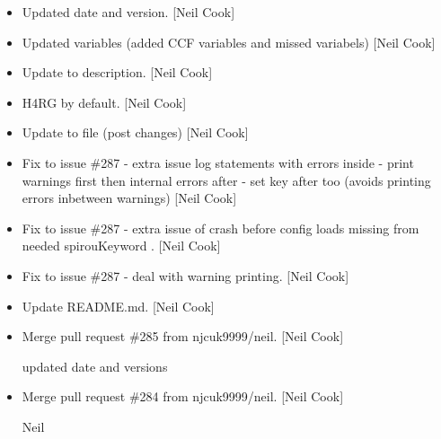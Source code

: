 \documentclass[a4paper,10pt,english]{report}
\begin{document}
\begin{itemize}
\item {} 
Updated date and version. {[}Neil Cook{]}

\item {} 
Updated variables (added CCF variables and missed 
variabels) {[}Neil Cook{]}

\item {} 
Update to  description. {[}Neil Cook{]}

\item {} 
H4RG by default. {[}Neil Cook{]}

\item {} 
Update to  file (post  changes) {[}Neil Cook{]}

\item {} 
Fix to issue \#287 - extra issue log statements with errors inside -
print warnings first then internal errors after - set key after too
(avoids printing errors inbetween warnings) {[}Neil Cook{]}

\item {} 
Fix to issue \#287 - extra issue of crash before config loads
 missing from needed spirouKeyword . {[}Neil
Cook{]}

\item {} 
Fix to issue \#287 - deal with  warning printing. {[}Neil
Cook{]}

\item {} 
Update README.md. {[}Neil Cook{]}

\item {} 
Merge pull request \#285 from njcuk9999/neil. {[}Neil Cook{]}

updated date and versions

\item {} 
Merge pull request \#284 from njcuk9999/neil. {[}Neil Cook{]}

Neil

\end{itemize}
\end{document}
